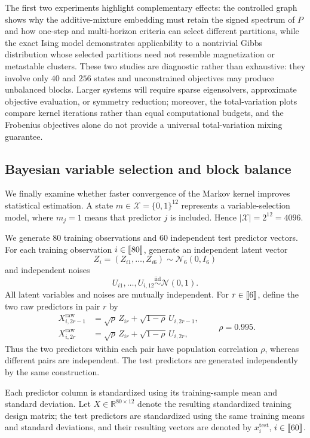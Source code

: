 \documentclass[11pt]{article}
\newcommand{\1}{\mathbf{1}}
\newcommand{\X}{\mathcal{X}}
\providecommand{\llbracket}{\mathopen{[\mkern-2.7mu[}}
\providecommand{\rrbracket}{\mathclose{]\mkern-2.7mu]}}
\begin{document}
The first two experiments highlight complementary effects: the controlled graph
shows why the additive-mixture embedding must retain the signed spectrum
of $P$ and how one-step and multi-horizon criteria can select different
partitions, while the exact Ising model demonstrates applicability
to a nontrivial Gibbs distribution whose selected partitions need not resemble
magnetization or metastable clusters.  These two studies are diagnostic
rather than exhaustive: they involve only $40$ and $256$ states and unconstrained
objectives may produce unbalanced blocks.  Larger systems will require
sparse eigensolvers, approximate objective evaluation, or symmetry
reduction; moreover, the total-variation plots compare kernel iterations
rather than equal computational budgets, and the Frobenius objectives
alone do not provide a universal total-variation mixing guarantee. 

\subsection{Bayesian variable selection and block balance}
\label{subsec:bvs-balance}

We finally examine whether faster convergence of the Markov kernel
improves statistical estimation.  A state
$m\in\X=\{0,1\}^{12}$ represents a variable-selection model, where
$m_j=1$ means that predictor $j$ is included.  Hence
$|\X|=2^{12}=4096$.

We generate $80$ training observations and $60$ independent test
predictor vectors.  For each training observation
$i\in\llbracket 80\rrbracket$,
generate an independent latent vector
\[
Z_i=(Z_{i1},\ldots,Z_{i6})
\sim \mathcal N_6(0,I_6)
\]
and independent noises
\[
U_{i1},\ldots,U_{i,12}
\stackrel{\mathrm{iid}}{\sim}\mathcal N(0,1).
\]
All latent variables and noises are mutually independent.  For
$r\in\llbracket 6\rrbracket$, define the two raw predictors in pair $r$ by
\[
\begin{aligned}
	X^{\mathrm{raw}}_{i,2r-1}
	&=
	\sqrt{\rho}\,Z_{ir}
	+\sqrt{1-\rho}\,U_{i,2r-1},\\
	X^{\mathrm{raw}}_{i,2r}
	&=
	\sqrt{\rho}\,Z_{ir}
	+\sqrt{1-\rho}\,U_{i,2r},
\end{aligned}
\qquad
\rho=0.995.
\]
Thus the two predictors within each pair have population correlation
$\rho$, whereas different pairs are independent.  The test predictors
are generated independently by the same construction.

Each predictor column is standardized using its training-sample mean
and standard deviation.  Let $X\in\mathbb R^{80\times12}$ denote the
resulting standardized training design matrix; the test predictors
are standardized using the same training means and standard
deviations, and their resulting vectors are denoted by
$x_i^{\mathrm{test}}$,
$i\in\llbracket 60\rrbracket$.
\end{document}
